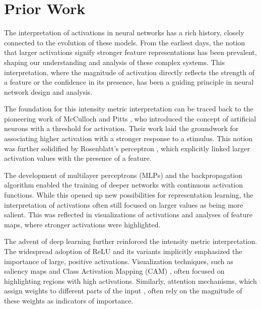 \section{Prior Work}

The interpretation of activations in neural networks has a rich history, closely connected to the evolution of these models. \citep{lecun1998gradient} From the earliest days, the notion that larger activations signify stronger feature representations has been prevalent, shaping our understanding and analysis of these complex systems. \citep{erhan2009visualizing, lecun1998gradient, mcculloch1943logical, rosenblatt1958perceptron, rumelhart1986learning} This interpretation, where the magnitude of activation directly reflects the strength of a feature or the confidence in its presence, has been a guiding principle in neural network design and analysis. \citep{zeiler2014visualizing,yosinski2015understanding,olah2017feature}  

The foundation for this intensity metric interpretation can be traced back to the pioneering work of McCulloch and Pitts \citep{mcculloch1943logical}, who introduced the concept of artificial neurons with a threshold for activation. Their work laid the groundwork for associating higher activation with a stronger response to a stimulus. This notion was further solidified by Rosenblatt's perceptron \citep{rosenblatt1958perceptron}, which explicitly linked larger activation values with the presence of a feature. \citep{rosenblatt1958perceptron,olah2017feature}

The development of multilayer perceptrons (MLPs) and the backpropagation algorithm \citep{rumelhart1986learning} enabled the training of deeper networks with continuous activation functions. \citep{lecun1989backpropagation,hornik1989multilayer,glorot2011deep} While this opened up new possibilities for representation learning, the interpretation of activations often still focused on larger values as being more salient. This was reflected in visualizations of activations and analyses of feature maps, where stronger activations were highlighted. \citep{zeiler2014visualizing,yosinski2015understanding}

The advent of deep learning further reinforced the intensity metric interpretation. \citep{krizhevsky2012imagenet} The widespread adoption of ReLU and its variants \citep{nair2010rectified,glorot2011deep} implicitly emphasized the importance of large, positive activations.  Visualization techniques, such as saliency maps \citep{simonyan2013deep} and Class Activation Mapping (CAM) \citep{zhou2016learning}, often focused on highlighting regions with high activations. Similarly, attention mechanisms, which assign weights to different parts of the input \citep{bahdanau2014neural,vaswani2017attention}, often rely on the magnitude of these weights as indicators of importance. 


